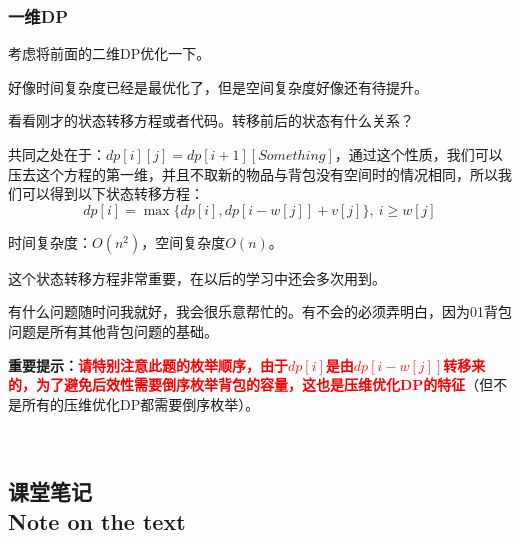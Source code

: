 \documentclass{article}
\theoremstyle{nonumberplain}
\newcommand{\note}{\ \par
	\subsection*{课堂笔记\\\tiny{Note on the text}}
	\newpage}
\begin{document}
\subsubsection{一维DP}
考虑将前面的二维DP优化一下。

好像时间复杂度已经是最优化了，但是空间复杂度好像还有待提升。

看看刚才的状态转移方程或者代码。转移前后的状态有什么关系？

共同之处在于：$dp[i][j]=dp[i+1][Something]$，通过这个性质，我们可以压去这个方程的第一维，并且不取新的物品与背包没有空间时的情况相同，所以我们可以得到以下状态转移方程：
\begin{equation*}dp[i]=\max\{dp[i],dp[i-w[j]]+v[j]\},\ i\geq w[j]\end{equation*}

时间复杂度：$O(n^2)$，空间复杂度$O(n)$。

这个状态转移方程非常重要，在以后的学习中还会多次用到。

有什么问题随时问我就好，我会很乐意帮忙的。有不会的必须弄明白，因为01背包问题是所有其他背包问题的基础。

\textbf{重要提示：}\textcolor{red}{\textbf{请特别注意此题的枚举顺序，由于$dp[i]$是由$dp[i-w[j]]$转移来的，为了避免后效性需要倒序枚举背包的容量，这也是压维优化DP的特征}}（但不是所有的压维优化DP都需要倒序枚举）。

\note
\end{document}
